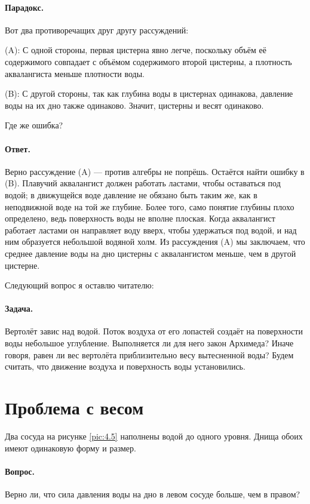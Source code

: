 \paragraph{Парадокс.} Вот два противоречащих друг другу рассуждений:

(A): С одной стороны, первая цистерна явно легче, поскольку объём её содержимого совпадает с объёмом содержимого второй цистерны, а плотность аквалангиста меньше плотности воды.

(B): С другой стороны, так как глубина воды в цистернах одинакова, давление воды на их дно также одинаково.
Значит, цистерны и весят одинаково.

Где же ошибка?

\paragraph{Ответ.}
Верно рассуждение (A) --- против алгебры не попрёшь.
Остаётся найти ошибку в (B).
Плавучий аквалангист должен работать ластами, чтобы оставаться под водой;
в движущейся воде давление не обязано быть таким же, как в неподвижной воде на той же глубине.%
Более того, само понятие глубины плохо определено, ведь поверхность воды не вполне плоская.
Когда аквалангист работает ластами он направляет воду вверх, чтобы удержаться под водой,
и над ним образуется небольшой водяной холм.
Из рассуждения (A) мы заключаем, что среднее давление воды на дно цистерны с аквалангистом меньше, чем в другой цистерне.

Следующий вопрос я оставлю читателю:

\paragraph{Задача.}
Вертолёт завис над водой.
Поток воздуха от его лопастей создаёт на поверхности воды небольшое углубление.
Выполняется ли для него закон Архимеда?
Иначе говоря, равен ли вес вертолёта приблизительно весу вытесненной воды?
Будем считать, что движение воздуха и поверхность воды установились.

\section{Проблема с весом}

Два сосуда на рисунке \ref{pic:4.5} наполнены водой до одного уровня.
Днища обоих имеют одинаковую форму и размер.

\paragraph{Вопрос.}
Верно ли, что сила давления воды на дно в левом сосуде больше, чем в правом?

